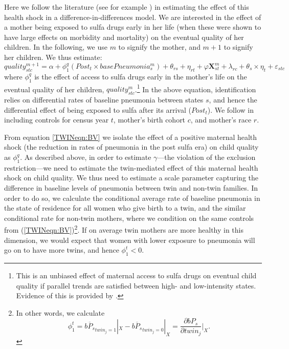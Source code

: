 \documentclass[subeqn]{article}
\begin{document}
\begin{spacing}{1.4}
Here we follow the literature (see for example \citet{BhalotraVenkataramani2014})
in estimating the effect of this health shock in a difference-in-differences model.
We are interested in the effect of a mother being exposed to sulfa drugs early
in her life (when these were shown to have large effects on morbidity and mortality)
on the eventual quality of her children.  In the following, we use $m$ to signify
the mother, and $m+1$ to signify her children.  We thus estimate:
\begin{equation}
  \label{TWINeqn:BV}
  quality^{m+1}_{stc} = \alpha + \phi^q_1 (Post_t\times basePneumonia^m_s) +\theta_{rs} +\eta_{rt}
  +\varphi\mathbf{X}^m_{st}+\lambda_{rc}+\theta_s\times\eta_t+\varepsilon_{stc}
\end{equation}
where $\phi^q_1$ is the effect of access to sulfa drugs early in the mother's life
on the eventual quality of her children, $quality^m_{stc}$.\footnote{This is an
  unbiased effect of maternal access to sulfa drugs on eventual child quality  if
  parallel trends are satisfied between high- and low-intensity states. Evidence of
  this is provided by \citet{BhalotraVenkataramani2014}.}  In the above equation,
identification relies on differential rates of baseline pneumonia between states
$s$, and hence the differential effect of being exposed to sulfa after its arrival
($Post_t$).  We follow \citet{BhalotraVenkataramani2014} in including controls
for census year $t$, mother's birth cohort $c$, and mother's race $r$.

From equation \ref{TWINeqn:BV} we isolate the effect of a positive maternal
health shock (the reduction in rates of pneumonia in the post sulfa era) on child
quality as $\phi^q_1$.  As described above, in order to estimate $\gamma$---the
violation of the exclusion restriction---we need to estimate the twin-mediated
effect of this maternal health shock on child quality.  We thus need to estimate
a scale parameter capturing the difference in baseline levels of pneumonia
between twin and non-twin families. %
In order to do so, we calculate the conditional average rate of baseline
pneumonia in the state of residence for all women who give birth to a twin, and
the similar conditional rate for non-twin mothers, where we condition on the same
controls from (\ref{TWINeqn:BV})\footnote{In other words, we calculate
  \[ \phi_1^t=\overline{bP_s}_{twin_j=1}|_{X}-\overline{bP_s}_{twin_j=0}|_{X}=
  \frac{\partial bP_s}{\partial twin_j}\bigg|_{X}.
  \]
}.  If on average twin mothers are more healthy in
this dimension, we would expect that women with lower exposure to pneumonia will
go on to have more twins, and hence $\phi_1^t<0$.


\end{spacing}
\end{document}
